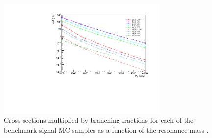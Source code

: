 %  

\begin{figure}[htbp]
  \centering
  \includegraphics[width=0.75\textwidth]{fig/samples/sigCrossSec.pdf}
  \caption{
    Cross sections multiplied by branching fractions for each of the benchmark signal MC samples as a function of the resonance mass \MX.
  }
  \label{fig:sigCrossSec}
\end{figure}

%  

%  


